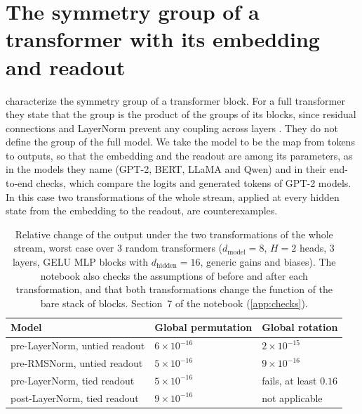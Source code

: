 \documentclass[10pt]{article}
\theoremstyle{definition}
\theoremstyle{remark}
\newcommand{\dm}{d_{\mathrm{model}}}
\newcommand{\dhid}{d_{\mathrm{hidden}}}
\begin{document}
\FloatBarrier
\section{The symmetry group of a transformer with its embedding and readout}\label{app:product}

\citet{wang2025gauge} characterize the symmetry group of a transformer block. For a full transformer they state that the group is the product of the groups of its blocks, since residual connections and LayerNorm prevent any coupling across layers \citep[Theorem~7]{wang2025gauge}. They do not define the group of the full model. We take the model to be the map from tokens to outputs, so that the embedding and the readout are among its parameters, as in the models they name (GPT-2, BERT, LLaMA and Qwen) and in their end-to-end checks, which compare the logits and generated tokens of GPT-2 models. In this case two transformations of the whole stream, applied at every hidden state from the embedding to the readout, are counterexamples.

\begin{table}[ht]
\centering\small
\caption{Relative change of the output under the two transformations of the whole stream, worst case over $3$ random transformers ($\dm = 8$, $H = 2$ heads, $3$ layers, GELU MLP blocks with $\dhid = 16$, generic gains and biases). The notebook also checks the assumptions of \citet{wang2025gauge} before and after each transformation, and that both transformations change the function of the bare stack of blocks. Section~7 of the notebook (\cref{app:checks}).}
\label{tab:product}
\begin{tabular}{lll}
\toprule
Model & Global permutation & Global rotation \\
\midrule
pre-LayerNorm, untied readout & $6\times10^{-16}$ & $2\times10^{-15}$ \\
pre-RMSNorm, untied readout & $5\times10^{-16}$ & $9\times10^{-16}$ \\
pre-LayerNorm, tied readout & $5\times10^{-16}$ & fails, at least $0.16$ \\
post-LayerNorm, tied readout & $9\times10^{-16}$ & not applicable \\
\bottomrule
\end{tabular}
\end{table}
\end{document}

